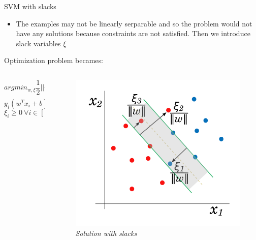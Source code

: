 \begin{frame}{SVM with slacks}
	\begin{itemize}\setlength\itemsep{1em}
		\item The examples may not be linearly serparable and so the problem would not have any solutions because constraints are not satisfied. Then we introduce slack variables $\xi$
	\end{itemize}
	Optimization problem becames:
	\begin{columns}
		\begin{column}{0.5\textwidth}\centering
			$$arg min_{w, \xi} \frac{1}{2} ||w||^2 + C \sum_{i = 1}{n}\xi^{(i)}$$
			$$y_i (w^T x_i + b) \geq 1 - \xi_i \ \forall i \in [1, n]$$
			$$\xi_i \geq 0 \ \forall i \in [1, n]$$
		\end{column}
		\begin{column}{0.5\textwidth}\centering
			\begin{figure}[htbp]
				\centering
				\includegraphics[scale = 0.15]{./images/slack2.png}
				\caption{\textit{Solution with slacks}}
			\end{figure}
		\end{column}
	\end{columns}
	
\end{frame}